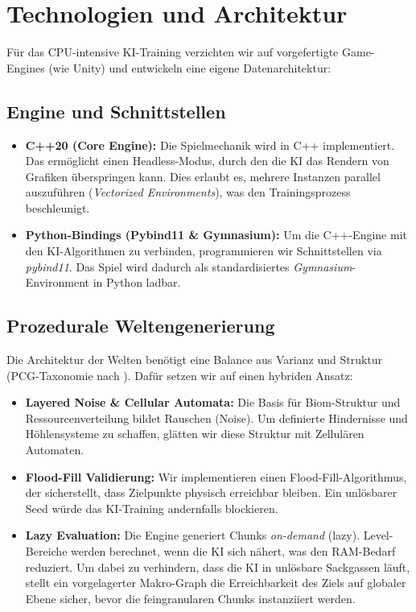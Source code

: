 \documentclass[12pt,a4paper]{article}
\begin{document}
\section{Technologien und Architektur}
F\"ur das CPU-intensive KI-Training verzichten wir auf vorgefertigte Game-Engines (wie Unity) und entwickeln eine eigene Datenarchitektur:

\subsection{Engine und Schnittstellen}
\begin{itemize}
    \item \textbf{C++20 (Core Engine):} Die Spielmechanik wird in C++ implementiert. Das erm\"oglicht einen \glqq Headless\grqq-Modus, durch den die KI das Rendern von Grafiken \"uberspringen kann. Dies erlaubt es, mehrere Instanzen parallel auszuf\"uhren (\textit{Vectorized Environments}), was den Trainingsprozess beschleunigt.
    \item \textbf{Python-Bindings (Pybind11 \& Gymnasium):} Um die C++-Engine mit den KI-Algorithmen zu verbinden, programmieren wir Schnittstellen via \textit{pybind11}. Das Spiel wird dadurch als standardisiertes \textit{Gymnasium}-Environment in Python ladbar.
\end{itemize}

\subsection{Prozedurale Weltengenerierung}
Die Architektur der Welten ben\"otigt eine Balance aus Varianz und Struktur (PCG-Taxonomie nach \cite{togelius2011search}). Daf\"ur setzen wir auf einen hybriden Ansatz:
\begin{itemize}
    \item \textbf{Layered Noise \& Cellular Automata:} Die Basis f\"ur Biom-Struktur und Ressourcenverteilung bildet Rauschen (Noise). Um definierte Hindernisse und H\"ohlensysteme zu schaffen, gl\"atten wir diese Struktur mit Zellul\"aren Automaten.
    \item \textbf{Flood-Fill Validierung:} Wir implementieren einen Flood-Fill-Algorithmus, der sicherstellt, dass Zielpunkte physisch erreichbar bleiben. Ein unl\"osbarer Seed w\"urde das KI-Training andernfalls blockieren.
    \item \textbf{Lazy Evaluation:} Die Engine generiert Chunks \textit{on-demand} (lazy). Level-Bereiche werden berechnet, wenn die KI sich n\"ahert, was den RAM-Bedarf reduziert. Um dabei zu verhindern, dass die KI in unl\"osbare Sackgassen l\"auft, stellt ein vorgelagerter Makro-Graph die Erreichbarkeit des Ziels auf globaler Ebene sicher, bevor die feingranularen Chunks instanziiert werden.
\end{itemize}
\end{document}
